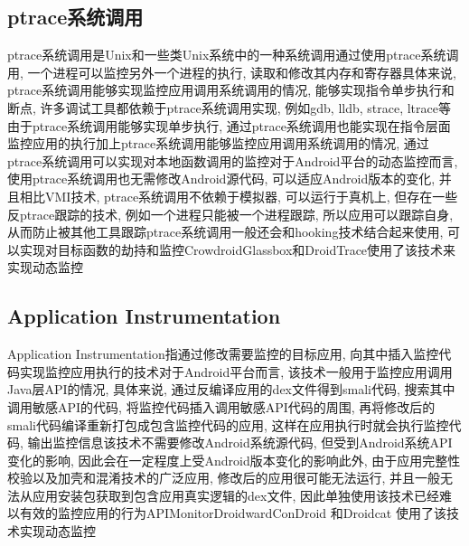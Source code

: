 \subsection{ptrace系统调用}
ptrace系统调用是Unix和一些类Unix系统中的一种系统调用\juhao 通过使用ptrace系统调用, 一个进程可以监控另外一个进程的执行, 读取和修改其内存和寄存器\juhao 具体来说, ptrace系统调用能够实现监控应用调用系统调用的情况, 能够实现指令单步执行和断点, 许多调试工具都依赖于ptrace系统调用实现, 例如gdb, lldb, strace, ltrace等\juhao 由于ptrace系统调用能够实现单步执行, 通过ptrace系统调用也能实现在指令层面监控应用的执行\juhao 加上ptrace系统调用能够监控应用调用系统调用的情况, 通过ptrace系统调用可以实现对本地函数调用的监控\juhao 对于Android平台的动态监控而言, 使用ptrace系统调用也无需修改Android源代码, 可以适应Android版本的变化, 并且相比VMI技术, ptrace系统调用不依赖于模拟器, 可以运行于真机上, 但存在一些反ptrace跟踪的技术, 例如一个进程只能被一个进程跟踪, 所以应用可以跟踪自身, 从而防止被其他工具跟踪\juhao ptrace系统调用一般还会和hooking技术结合起来使用, 可以实现对目标函数的劫持和监控\juhao Crowdroid\dunhao Glassbox和DroidTrace使用了该技术来实现动态监控\juhao

\subsection{Application Instrumentation}
Application Instrumentation指通过修改需要监控的目标应用, 向其中插入监控代码实现监控应用执行的技术\juhao 对于Android平台而言, 该技术一般用于监控应用调用Java层API的情况, 具体来说, 通过反编译应用的dex文件得到smali代码, 搜索其中调用敏感API的代码, 将监控代码插入调用敏感API代码的周围, 再将修改后的smali代码编译重新打包成包含监控代码的应用, 这样在应用执行时就会执行监控代码, 输出监控信息\juhao 该技术不需要修改Android系统源代码, 但受到Android系统API变化的影响, 因此会在一定程度上受Android版本变化的影响\juhao 此外, 由于应用完整性校验以及加壳和混淆技术的广泛应用, 修改后的应用很可能无法运行, 并且一般无法从应用安装包获取到包含应用真实逻辑的dex文件, 因此单独使用该技术已经难以有效的监控应用的行为\juhao APIMonitor\dunhao Droidward\dunhao ConDroid 和Droidcat 使用了该技术实现动态监控\juhao

